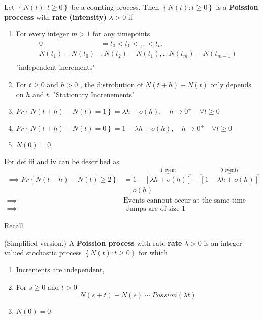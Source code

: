 \documentclass{article}
\theoremstyle{remark}
\begin{document}
\begin{definition}
  Let $\left\{ N\left( t \right) : t \ge 0 \right\}$ be a counting process. Then $\left\{ N\left( t \right): t \ge 0 \right\}$ is  a \textbf{Poission proccess}  with \textbf{rate (intensity)}  $\lambda > 0 $  if 
  \begin{enumerate}[label=(\roman*)]
    \item For every integer $m> 1$ for any timepoints \[
        \begin{split}
    0  & = t_{0} < t_{1} < \ldots < t_{m} \\
    N\left( t_{1} \right) - N\left( t_{0} \right)  & , N\left( t_{2} \right) - N\left( t_{1} \right), \ldots N\left( t_{m} \right) - N\left( t_{m-1} \right)  \\
        \end{split} 
    \] 
    "independent increments"
  \item For $t\ge 0$ and $h > 0$ ,  the distrobution of $N\left( t + h \right) - N\left( t \right)$  only depends on $h$ and $t$.
    "Stationary Increnements" 
  \item  $Pr \left \{ N\left( t + h \right) - N\left( t \right) = 1 \right \}  = \lambda  h + o\left( h \right), \quad h \to 0^{+} \quad   \forall t\ge0 $
  \item $Pr \left \{ N\left( t + h \right) - N\left( t \right) = 0 \right \}  = 1 - \lambda h  + o\left( h \right),  \quad h\to 0^{+} \quad  \forall t\ge 0  $
  \item $N\left( 0 \right) = 0$

  \end{enumerate}
  For def iii and iv can be described as \[
  \begin{split}
    \implies  Pr \left \{ N\left( t + h \right) - N\left( t \right) \ge 2  \right \}  &=  1 - \overbrace{\left[ \lambda h + o\left( h \right) \right] }^{ 1 \text{ event}} - \overbrace{\left[ 1 - \lambda h + o\left( h \right) \right]}^{0 \text{ events}}  \\
    &= o\left( h \right) \\
    \implies  & \text{Events cannout occur at the same time} \\
    \implies  &  \text{ Jumps are of size 1}
  \end{split} 
  \] 
\end{definition}

Recall

\begin{definition}
  (Simplified version.) A \textbf{Poission process}  with rate \textbf{rate}  $\lambda > 0$ is an integer valued  stochastic process $\left\{ N\left( t \right) : t \ge 0 \right\}$ for which 
  \begin{enumerate}[label=(\roman*)]
    \item Increments are independent,
    \item For $s \ge 0$ and $t > 0$ \[
    N\left( s+t \right) - N\left( s \right) \sim Possion\left( \lambda t \right)
    \] 
  \item $N\left( 0 \right) = 0$
  \end{enumerate}
\end{definition}
\end{document}
